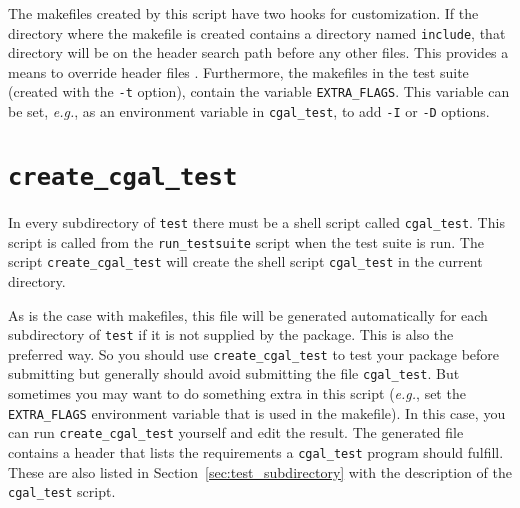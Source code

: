 The makefiles created by this script have two hooks for customization.
If the directory
where the makefile is created contains a directory named {\tt include},%
that
directory will be on the header search path before any other files. This
provides a means to override header files%
.
Furthermore, the makefiles in the
test suite (created with the {\tt -t} option), contain the variable
{\tt EXTRA\_FLAGS}.%
This variable can be set, {\em e.g.}, as an environment variable in
{\tt cgal\_test}, to add {\tt -I} or {\tt -D} options.


\section{{\tt create\_cgal\_test}}
\label{sec:create_cgal_test}

In every subdirectory of {\tt test} there must be a shell script called
{\tt cgal\_test}. This script is called from the {\tt run\_testsuite}%
script when the test suite is run. The script
{{\tt create\_cgal\_test}}
will create the shell script {\tt cgal\_test} in the current directory.

As is the case with makefiles, this file will be generated automatically for
each subdirectory of {\tt test} if
it is not supplied by the package. This is also the preferred way.
So you should use {\tt create\_cgal\_test} to test your package before
submitting but generally should avoid submitting the file {\tt cgal\_test}.
But sometimes you may want to do something extra in this script ({\em e.g.}, set
the {\tt EXTRA\_FLAGS}
environment variable that is used in the makefile).
In this case, you can run {\tt create\_cgal\_test} yourself and edit the result.
The generated file contains a header that lists the requirements a
{\tt cgal\_test} program should fulfill. These are also listed in
Section~\ref{sec:test_subdirectory} with the description of the
{\tt cgal\_test} script.

